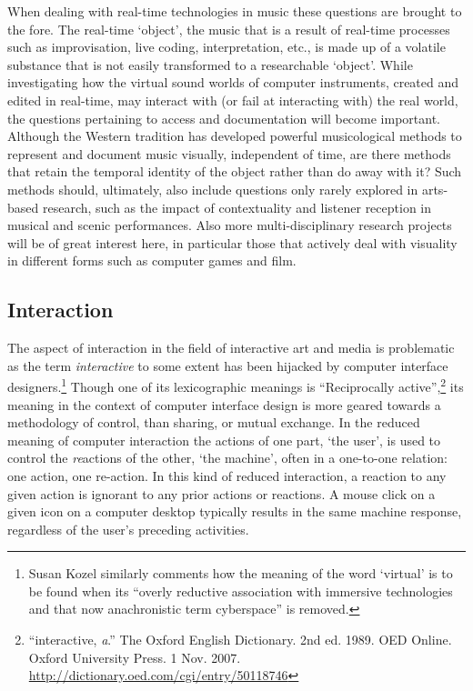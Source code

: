 When dealing with real-time technologies in music these questions are brought to the fore. The real-time `object', the music that is a result of real-time processes such as improvisation, live coding, interpretation, etc., is made up of a volatile substance that is not easily transformed to a researchable `object'. While investigating how the virtual sound worlds of computer instruments, created and edited in real-time, may interact with (or fail at interacting with) the real world, the questions pertaining to access and documentation will become important. 
Although the Western tradition has developed powerful musicological methods to represent and document music visually, \parencite{bregman94} independent of time, are there methods that retain the temporal identity of the object rather than do away with it? Such methods should, ultimately, also include questions only rarely explored in arts-based research, such as the impact of contextuality and listener reception in musical and scenic performances. Also more multi-disciplinary research projects will be of great interest here, in particular those that actively deal with visuality in different forms such as computer games and film. 


\subsection*{Interaction}
\label{sec:interaction}


The aspect of interaction in the field of interactive art and media is problematic as the term \emph{interactive} to some extent has been hijacked by computer interface designers.\footnote{Susan Kozel similarly comments how the meaning of the word `virtual' is to be found when its ``overly reductive association with immersive technologies and that now anachronistic term cyberspace'' is removed.} Though one of its lexicographic meanings is ``Reciprocally active'',\footnote{``interactive, \textit{a}.'' The Oxford English Dictionary. 2nd ed. 1989. OED Online. Oxford University Press. 1 Nov. 2007. \url{http://dictionary.oed.com/cgi/entry/50118746}} its meaning in the context of computer interface design is more geared towards a methodology of control, than sharing, or mutual exchange. In the reduced meaning of computer interaction the actions of one part, `the user', is used to control the \emph{re}actions of the other, `the machine', often in a one-to-one relation: one action, one re-action. In this kind of reduced interaction, a reaction to any given action is ignorant to any prior actions or reactions. A mouse click on a given icon on a computer desktop typically results in the same machine response, regardless of the user's preceding activities.

